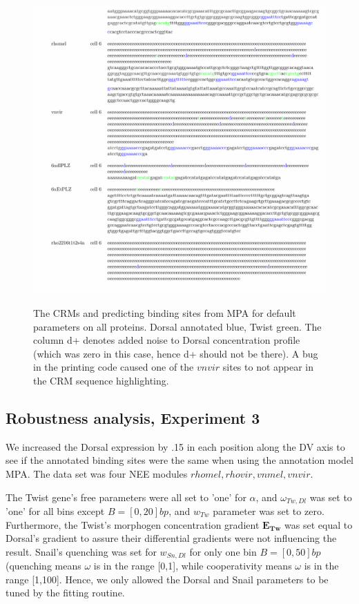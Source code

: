 \begin{figure}
  \includegraphics[width=1\textwidth]{annNosnail.pdf}\\
  \caption{The CRMs and predicting binding sites from MPA for default parameters on all proteins.  Dorsal annotated blue, Twist green. The column d+ denotes added noise to Dorsal concentration profile (which was zero in this case, hence d+ should not be there).  A bug in the printing code caused one of the $vnvir$ sites to not appear in the CRM sequence highlighting. }\label{roughfit}
\end{figure}




\subsection{Robustness analysis, Experiment 3 }
We increased the Dorsal expression by .15 in each position along the DV axis to see if the annotated binding sites were the same when using the annotation model MPA.  The data set was four NEE modules $rhomel, rhovir, vnmel, vnvir$.


The Twist gene's free parameters were all set to 'one' for $\alpha$, and $\omega_{Tw,Dl}$ was set to 'one' for all bins except $B=[0,20]bp$, and $w_{Tw}$ parameter was set to zero.  Furthermore, the Twist's morphogen concentration gradient $\bm{E_{Tw}}$ was set equal to Dorsal's gradient to assure their differential gradients were not influencing the result.  Snail's quenching was set for $w_{Sn,Dl}$ for only one bin $B=[0,50]bp$ (quenching means $\omega$ is in the range [0,1], while cooperativity means $\omega$ is in the range [1,100].  Hence, we only allowed the Dorsal and Snail parameters to be tuned by the fitting routine.
 
